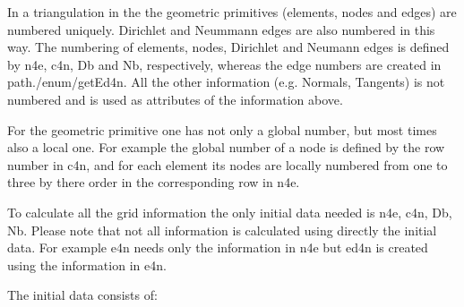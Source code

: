 In a triangulation in the \FFW the geometric primitives (elements, nodes and edges) are 
numbered uniquely. Dirichlet and Neummann edges are also numbered in this way. The numbering of 
elements, nodes, Dirichlet and Neumann edges is defined by n4e, c4n, Db and Nb, respectively, 
whereas the edge numbers are created in path{./enum/getEd4n}. All the other information (e.g. Normals, Tangents) 
is not numbered and is used as attributes of the information above.

For the geometric primitive one has not only a global number, but most times also a local one. 
For example the global number of a node is defined by the row number in c4n, and for each 
element its nodes are locally numbered from one to three by there order in the 
corresponding row in n4e.

To calculate all the grid information the only initial data needed is n4e, c4n, Db, Nb.
Please note that not all information is calculated using directly the initial data. For
example e4n needs only the information in n4e but ed4n is created using the information 
in e4n.

%


The initial data consists of:

